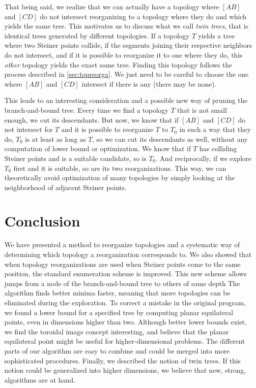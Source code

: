 \documentclass{article}
\theoremstyle{plain}
\begin{document}
That being said, we realize that we can actually have a topology where $[AB]$ and $[CD]$ do not intersect reorganizing to a topology where they do and which yields the same tree. 
This motivates us to discuss what we call \emph{twin trees}, that is identical trees generated by different topologies. 
If a topology $T$ yields a tree where two Steiner points collide, if the segments joining their respective neighbors do not intersect, and if it is possible to reorganize it to one where they do, this \emph{other} topology yields the exact same tree. 
Finding this topology follows the process described in \cref{sec:topreorga}. 
We just need to be careful to choose the one where $[AB]$ and $[CD]$ intersect if there is any (there may be none).

This leads to an interesting consideration and a possible new way of pruning the \mbox{branch-and-bound} tree. 
Every time we find a topology $T$ that is not small enough, we cut its descendants. 
But now, we know that if $[AB]$ and $[CD]$ do not intersect for $T$ and it is possible to reorganize $T$ to $T_0$ in such a way that they do, $T_0$ is at least as long as $T$, so we can cut its descendants as well, without any computation of lower bound or optimization. 
We know that if $T$ has colliding Steiner points and is a suitable candidate, so is $T_0$.
And reciprocally, if we explore $T_0$ first and it is suitable, so are its two reorganizations.
This way, we can theoretically avoid optimization of many topologies by simply looking at the neighborhood of adjacent Steiner points.


\FloatBarrier







\section{Conclusion}
\label{sec:conclusion}
 
We have presented a method to reorganize topologies and a systematic way of determining which topology a reorganization corresponds to.
We also showed that when topology reorganizations are used when Steiner points come to the same position, the standard enumeration scheme is improved.
This new scheme allows jumps from a node of the \mbox{branch-and-bound} tree to others of same depth
The algorithm finds better minima faster, meaning that more topologies can be eliminated during the exploration. 
To correct a mistake in the original program, we found a lower bound for a specified tree by computing planar equilateral points, even in dimensions higher than two. 
Although better lower bounds exist, we find the toroidal image concept interesting, and believe that the planar equilateral point might be useful for higher-dimensional problems. 
The different parts of our algorithm are easy to combine and could be merged into more sophisticated procedures.
Finally, we described the notion of twin trees. If this notion could be generalized into higher dimensions, we believe that new, strong, algorithms are at hand.
\end{document}
